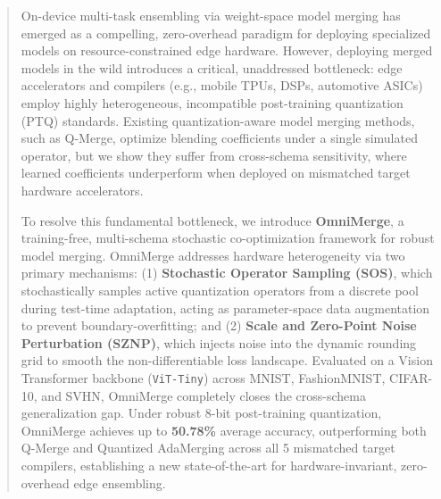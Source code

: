 \begin{abstract}
On-device multi-task ensembling via weight-space model merging has emerged as a compelling, zero-overhead paradigm for deploying specialized models on resource-constrained edge hardware. However, deploying merged models in the wild introduces a critical, unaddressed bottleneck: edge accelerators and compilers (e.g., mobile TPUs, DSPs, automotive ASICs) employ highly heterogeneous, incompatible post-training quantization (PTQ) standards. Existing quantization-aware model merging methods, such as Q-Merge, optimize blending coefficients under a single simulated operator, but we show they suffer from cross-schema sensitivity, where learned coefficients underperform when deployed on mismatched target hardware accelerators. 

To resolve this fundamental bottleneck, we introduce \textbf{OmniMerge}, a training-free, multi-schema stochastic co-optimization framework for robust model merging. OmniMerge addresses hardware heterogeneity via two primary mechanisms: (1) \textbf{Stochastic Operator Sampling (SOS)}, which stochastically samples active quantization operators from a discrete pool during test-time adaptation, acting as parameter-space data augmentation to prevent boundary-overfitting; and (2) \textbf{Scale and Zero-Point Noise Perturbation (SZNP)}, which injects noise into the dynamic rounding grid to smooth the non-differentiable loss landscape. Evaluated on a Vision Transformer backbone (\texttt{ViT-Tiny}) across MNIST, FashionMNIST, CIFAR-10, and SVHN, OmniMerge completely closes the cross-schema generalization gap. Under robust 8-bit post-training quantization, OmniMerge achieves up to \textbf{50.78\%} average accuracy, outperforming both Q-Merge and Quantized AdaMerging across all 5 mismatched target compilers, establishing a new state-of-the-art for hardware-invariant, zero-overhead edge ensembling.
\end{abstract}
